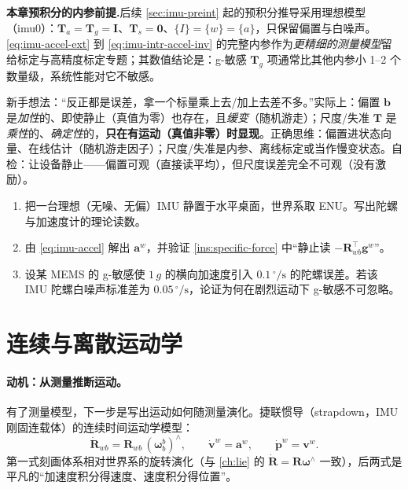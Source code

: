 \begin{note}
\textbf{本章预积分的内参前提.}\;后续 \cref{sec:imu-preint} 起的预积分推导采用理想模型（imu0）：$\mathbf T_a=\mathbf T_g=\mathbf I$、$\mathbf T_s=\mathbf 0$、$\{I\}=\{w\}=\{a\}$，只保留偏置与白噪声。\cref{eq:imu-accel-ext} 到 \cref{eq:imu-intr-accel-inv} 的完整内参作为\emph{更精细的测量模型}留给标定与高精度标定专题；其数值结论是：g-敏感 $\mathbf T_g$ 项通常比其他内参小 1--2 个数量级，系统性能对它不敏感\cite{yang2022online}。
\end{note}

\begin{pitfall}
新手想法：“反正都是误差，拿一个标量乘上去/加上去差不多。”实际上：偏置 $\mathbf b$ 是\emph{加性}的、即使静止（真值为零）也存在，且\emph{缓变}（随机游走）；尺度/失准 $\mathbf T$ 是\emph{乘性}的、\emph{确定性}的，\textbf{只在有运动（真值非零）时显现}。正确思维：偏置进状态向量、在线估计（随机游走因子）；尺度/失准是内参、离线标定或当作慢变状态。自检：让设备静止——偏置可观（直接读平均），但尺度误差完全不可观（没有激励）。
\end{pitfall}

\begin{practice}
\begin{enumerate}
  \item 把一台理想（无噪、无偏）IMU 静置于水平桌面，世界系取 ENU。写出陀螺与加速度计的理论读数。
  \item 由 \cref{eq:imu-accel} 解出 $\mathbf a^w$，并验证 \cref{ins:specific-force} 中“静止读 $-\mathbf R_{wb}^\top\mathbf g^w$”。
  \item 设某 MEMS 的 g-敏感使 $1\,g$ 的横向加速度引入 $0.1\,^\circ/\mathrm s$ 的陀螺误差。若该 IMU 陀螺白噪声标准差为 $0.05\,^\circ/\mathrm s$，论证为何在剧烈运动下 g-敏感不可忽略。
\end{enumerate}
\end{practice}

\section{连续与离散运动学}
\label{sec:imu-kinematics}

\paragraph{动机：从测量推断运动。}
有了测量模型，下一步是写出运动如何随测量演化。捷联惯导（strapdown，IMU 刚固连载体）的连续时间运动学模型\cite{forster2017preintegration,woodman2007inertial}：
\begin{equation}
  \dot{\mathbf R}_{wb}=\mathbf R_{wb}\,(\boldsymbol\omega_b^b)^\wedge,\qquad
  \dot{\mathbf v}^w=\mathbf a^w,\qquad
  \dot{\mathbf p}^w=\mathbf v^w.
  \label{eq:imu-kin-cont}
\end{equation}
第一式刻画体系相对世界系的旋转演化（与 \cref{ch:lie} 的 $\dot{\mathbf R}=\mathbf R\boldsymbol\omega^\wedge$ 一致），后两式是平凡的“加速度积分得速度、速度积分得位置”。

